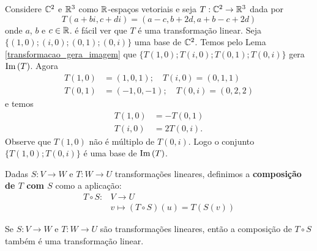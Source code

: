 \begin{exemplo}
  Considere $\mathbb{C}^2$ e $\mathbb{R}^3$ como $\mathbb{R}$-espaços vetoriais e seja $T : \mathbb{C}^2 \to \mathbb{R}^3$ dada por
  \[
    T(a+bi, c+di) = (a - c, b + 2d, a + b - c + 2d)
  \]
  onde $a$, $b$ e $c \in \mathbb{R}$. é fácil ver que $T$ é uma transformação linear. Seja $\{(1,0);(i,0);(0,1);(0,i)\}$ uma base de $\mathbb{C}^2$. Temos pelo Lema \ref{transformacao_gera_imagem} que $\{T(1,0);T(i,0);T(0,1);T(0,i)\}$ gera ${\rm Im\,}(T)$. Agora
  \begin{align*}
    T(1,0) &= (1,0,1);\quad T(i,0) = (0,1,1)\\
    T(0,1) &= (-1,0,-1);\quad T(0,i) = (0,2,2)
  \end{align*}
  e temos
  \begin{align*}
    T(1,0) &= -T(0,1)\\
    T(i,0) &= 2T(0,i).
  \end{align*}
  Observe que $T(1,0)$ não é múltiplo de $T(0,i)$. Logo o conjunto $\{T(1,0); T(0,i)\}$ é uma base de ${\rm Im\,}(T)$.
\end{exemplo}

\begin{definicao}
  Dadas $S \colon V \to W$  e $T \colon W \to U$ transformações lineares,  definimos a \textbf{composição de $T$ com $S$}  como a aplicação: 
  \begin{align*}
    T \circ S \colon &V \to U\\
                     &v \mapsto (T\circ S)(u) = T(S(v))
  \end{align*}
\end{definicao}

\begin{proposicao}
  Se $S \colon V \to W$ e $T \colon W \to U$ são transformações lineares,  então a composição de $T\circ S$ também é uma transformação linear.
\end{proposicao}

